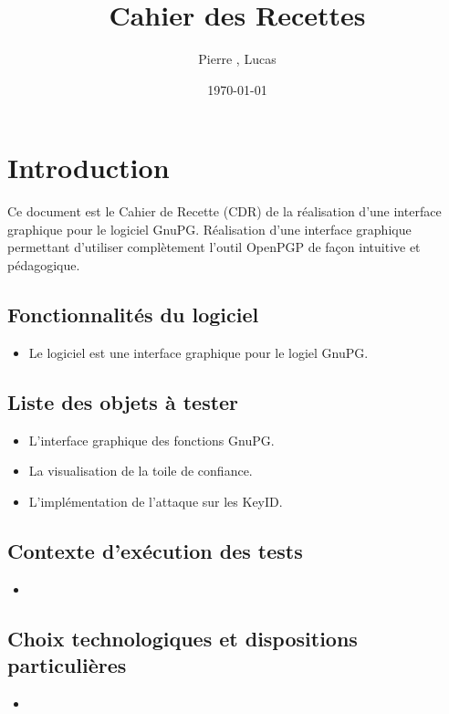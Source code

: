 \documentclass{../res/univ-projet}
\title{Cahier des Recettes}
\author{Pierre \bsc{Balmelle}, Lucas \bsc{Barbay}}
\date{\today}
\begin{document}
\maketitle
\newpage
\tableofcontents
\newpage

\section{Introduction}

Ce document est le Cahier de Recette (CDR) de la réalisation d'une interface graphique pour le logiciel GnuPG.
Réalisation d'une interface graphique permettant d'utiliser complètement l'outil OpenPGP
de façon intuitive et pédagogique.

\subsection{Fonctionnalités du logiciel}
\begin{itemize}
 \item Le logiciel est une interface graphique pour le logiel GnuPG.
\end{itemize}

\subsection{Liste des objets à tester}
\begin{itemize}
 \item L'interface graphique des fonctions GnuPG.
 \item La visualisation de la toile de confiance.
 \item L'implémentation de l'attaque sur les KeyID. 
\end{itemize}

\subsection{Contexte d'exécution des tests}
\begin{itemize}
 \item
\end{itemize}

\subsection{Choix technologiques et dispositions particulières}
\begin{itemize}
 \item 
\end{itemize}
\end{document}
